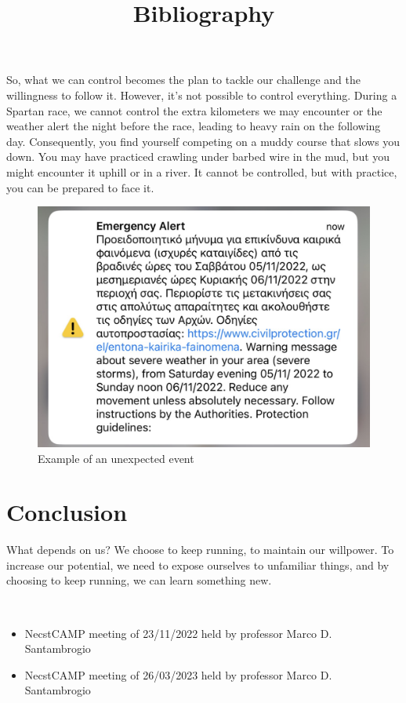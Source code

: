 \documentclass[12pt,oneside,a4paper]{article}
\begin{document}
So, what we can control becomes the plan to tackle our challenge and the willingness to follow it. However, it's not possible to control everything. During a Spartan race, we cannot control the extra kilometers we may encounter or the weather alert the night before the race, leading to heavy rain on the following day. Consequently, you find yourself competing on a muddy course that slows you down. You may have practiced crawling under barbed wire in the mud, but you might encounter it uphill or in a river. It cannot be controlled, but with practice, you can be prepared to face it.
\begin{figure}[h]
    \centering
    \includegraphics[width=.7\textwidth]{alert.png}
    \caption{Example of an unexpected event}
    \label{fig:my_label}
\end{figure}


\section{Conclusion} \label{sec:concl}
What depends on us? We choose to keep running, to maintain our willpower. To increase our potential, we need to expose ourselves to unfamiliar things, and by choosing to keep running, we can learn something new.


\newpage
\title{\textbf{Bibliography}} \\
\begin{itemize}
\item NecstCAMP meeting of 23/11/2022 held by professor Marco D. Santambrogio
\item NecstCAMP meeting of 26/03/2023 held by professor Marco D. Santambrogio
\end{itemize}
\end{document}
